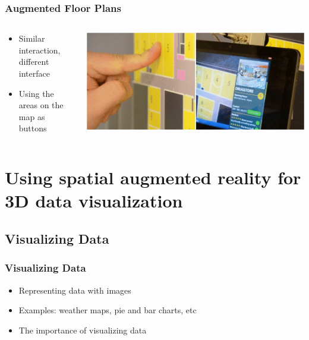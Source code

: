 \documentclass{beamer}
\begin{document}
\begin{frame}
	\frametitle{Augmented Floor Plans}
	\begin{columns}
	\begin{column}{0.45\textwidth}
	\begin{itemize}
		\item Similar interaction, different interface
		\item Using the areas on the map as buttons
	\end{itemize}
	\end{column}
	\begin{column}{0.55\textwidth}
	\includegraphics[width=\textwidth]{images/AugmentedFloorPlans}
	
	\cite{3D}
	\end{column}
	\end{columns}	
\end{frame}

\section[Using spatial augmented reality for 3D data visualization]{Using spatial augmented reality for 3D data visualization}

\subsection{Visualizing Data}
\begin{frame}	
\frametitle{Visualizing Data}
	\begin{itemize}
		\item Representing data with images
		\item Examples: weather maps, pie and bar charts, etc
		\item The importance of visualizing data
	\end{itemize}
\end{frame}
\end{document}
